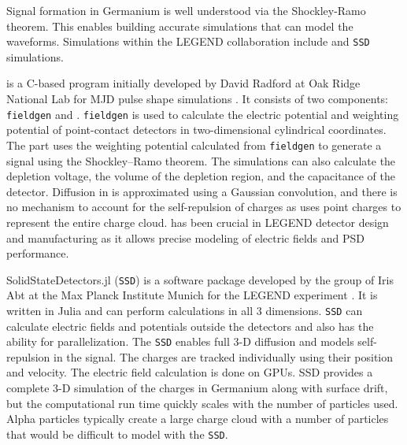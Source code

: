 Signal formation in Germanium is well understood via the Shockley-Ramo theorem. This enables building accurate simulations that can model the waveforms. Simulations within the LEGEND collaboration include {\siggen} and \texttt{SSD} simulations. 

{\siggen} is a C-based program initially developed by David Radford at Oak Ridge National Lab for MJD pulse shape simulations \cite{siggen_paper}. It consists of two components: \texttt{fieldgen} and {\siggen}. \texttt{fieldgen} is used to calculate the electric potential and weighting potential of point-contact detectors in two-dimensional cylindrical coordinates. The {\siggen} part uses the weighting potential calculated from \texttt{fieldgen} to generate a signal using the Shockley–Ramo theorem. The simulations can also calculate the depletion voltage, the volume of the depletion region, and the capacitance of the detector. Diffusion in {\siggen} is approximated using a Gaussian convolution, and there is no mechanism to account for the self-repulsion of charges as {\siggen} uses point charges to represent the entire charge cloud. {\siggen} has been crucial in LEGEND detector design and manufacturing as it allows precise modeling of electric fields and PSD performance.



SolidStateDetectors.jl (\texttt{SSD}) is a software package developed by the group of Iris Abt at the Max Planck Institute Munich for the LEGEND experiment \cite{Abt:2021SSD}. It is written in Julia and can perform calculations in all 3 dimensions. \texttt{SSD} can calculate electric fields and potentials outside the detectors and also has the ability for parallelization. The \texttt{SSD} enables full 3-D diffusion and models self-repulsion in the signal. The charges are tracked individually using their position and velocity. The electric field calculation is done on GPUs. SSD provides a complete 3-D simulation of the charges in Germanium along with surface drift, but the computational run time quickly scales with the number of particles used. Alpha particles typically create a large charge cloud with a number of particles that would be difficult to model with the \texttt{SSD}.

